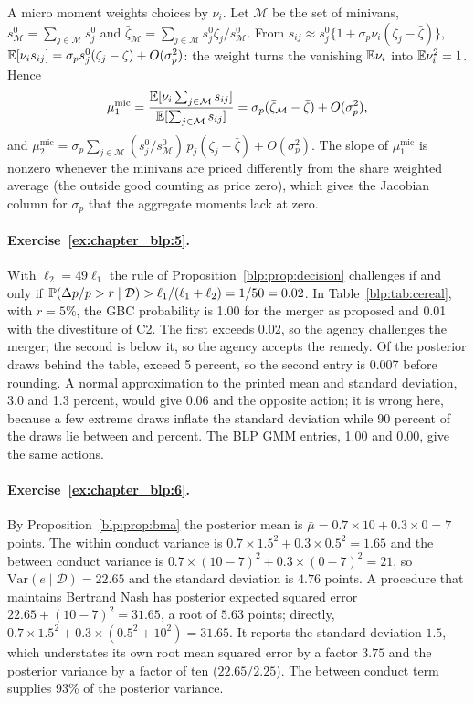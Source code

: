 A micro moment weights choices by $\nu_i$. Let $\mathcal M$ be the set of minivans, $s^0_{\mathcal M}=\sum_{j\in\mathcal M}s^0_j$ and $\bar\zeta_{\mathcal M}=\sum_{j\in\mathcal M}s^0_j\zeta_j/s^0_{\mathcal M}$. From $s_{ij}\approx s^0_j\{1+\sigma_p\nu_i(\zeta_j-\bar\zeta)\}$, $\mathbb{E}[\nu_is_{ij}]=\sigma_ps^0_j(\zeta_j-\bar\zeta)+O(\sigma_p^2)$: the weight turns the vanishing $\mathbb{E}\nu_i$ into $\mathbb{E}\nu_i^2=1$. Hence
\[
\mu^{\mathrm{mic}}_1=\frac{\mathbb{E}[\nu_i\sum_{j\in\mathcal M}s_{ij}]}{\mathbb{E}[\sum_{j\in\mathcal M}s_{ij}]}=\sigma_p(\bar\zeta_{\mathcal M}-\bar\zeta)+O(\sigma_p^2),
\]
and $\mu^{\mathrm{mic}}_2=\sigma_p\sum_{j\in\mathcal M}(s^0_j/s^0_{\mathcal M})\,p_j(\zeta_j-\bar\zeta)+O(\sigma_p^2)$. The slope of $\mu^{\mathrm{mic}}_1$ is nonzero whenever the minivans are priced differently from the share weighted average (the outside good counting as price zero), which gives the Jacobian column for $\sigma_p$ that the aggregate moments lack at zero.

\paragraph{Exercise~\ref{ex:chapter_blp:5}.} With $\ell_2=49\ell_1$ the rule of Proposition~\ref{blp:prop:decision} challenges if and only if $\mathbb{P}(\Delta p/p>r\mid\mathcal D)>\ell_1/(\ell_1+\ell_2)=1/50=0.02$. In Table~\ref{blp:tab:cereal}, with $r=5\%$, the GBC probability is 1.00 for the merger as proposed and 0.01 with the divestiture of C2. The first exceeds 0.02, so the agency challenges the merger; the second is below it, so the agency accepts the remedy. Of the \numcerngbcdraws{} posterior draws behind the table, \numcerprgbcnabove{} exceed 5 percent, so the second entry is 0.007 before rounding. A normal approximation to the printed mean and standard deviation, 3.0 and 1.3 percent, would give 0.06 and the opposite action; it is wrong here, because a few extreme draws inflate the standard deviation while 90 percent of the draws lie between \numcerdprgbcqlo{} and \numcerdprgbcqhi{} percent. The BLP GMM entries, 1.00 and 0.00, give the same actions. 

\paragraph{Exercise~\ref{ex:chapter_blp:6}.} By Proposition~\ref{blp:prop:bma} the posterior mean is $\bar\mu=0.7\times10+0.3\times0=7$ points. The within conduct variance is $0.7\times1.5^2+0.3\times0.5^2=1.65$ and the between conduct variance is $0.7\times(10-7)^2+0.3\times(0-7)^2=21$, so $\mathrm{Var}(e\mid\mathcal D)=22.65$ and the standard deviation is $4.76$ points. A procedure that maintains Bertrand Nash has posterior expected squared error $22.65+(10-7)^2=31.65$, a root of $5.63$ points; directly, $0.7\times1.5^2+0.3\times(0.5^2+10^2)=31.65$. It reports the standard deviation $1.5$, which understates its own root mean squared error by a factor $3.75$ and the posterior variance by a factor of ten ($22.65/2.25$). The between conduct term supplies 93\% of the posterior variance.

